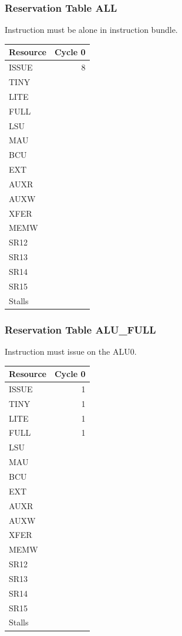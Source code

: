 \subsubsection{Reservation Table ALL} \label{sec:reservation-ALL}

Instruction must be alone in instruction bundle.
\medskip

\begin{tabular}{|l|r|} \hline
Resource	& Cycle 0 \\ \hline
\textsf{ISSUE}	& 8	\\
\textsf{TINY}	& 	\\
\textsf{LITE}	& 	\\
\textsf{FULL}	& 	\\
\textsf{LSU}	& 	\\
\textsf{MAU}	& 	\\
\textsf{BCU}	& 	\\
\textsf{EXT}	& 	\\
\textsf{AUXR}	& 	\\
\textsf{AUXW}	& 	\\
\textsf{XFER}	& 	\\
\textsf{MEMW}	& 	\\
\textsf{SR12}	& 	\\
\textsf{SR13}	& 	\\
\textsf{SR14}	& 	\\
\textsf{SR15}	& 	\\
\hline Stalls	& 	\\
\hline \end{tabular}

\subsubsection{Reservation Table ALU\_FULL} \label{sec:reservation-ALU-FULL}

Instruction must issue on the ALU0.
\medskip

\begin{tabular}{|l|r|} \hline
Resource	& Cycle 0 \\ \hline
\textsf{ISSUE}	& 1	\\
\textsf{TINY}	& 1	\\
\textsf{LITE}	& 1	\\
\textsf{FULL}	& 1	\\
\textsf{LSU}	& 	\\
\textsf{MAU}	& 	\\
\textsf{BCU}	& 	\\
\textsf{EXT}	& 	\\
\textsf{AUXR}	& 	\\
\textsf{AUXW}	& 	\\
\textsf{XFER}	& 	\\
\textsf{MEMW}	& 	\\
\textsf{SR12}	& 	\\
\textsf{SR13}	& 	\\
\textsf{SR14}	& 	\\
\textsf{SR15}	& 	\\
\hline Stalls	& 	\\
\hline \end{tabular}

